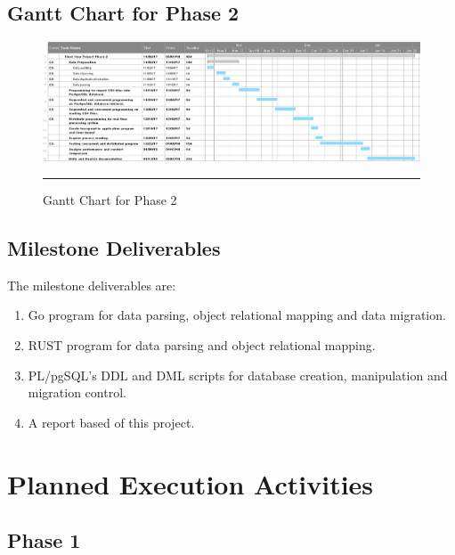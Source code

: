 \begin{landscape}
	\subsection{Gantt Chart for Phase 2}
	\begin{figure}[H]
		\centering
		\includegraphics[width=1.5\textwidth]{Figure/Gantt2.png}
		\rule{35em}{0.5pt}
		\caption[Gantt Chart for Phase 2]{Gantt Chart for Phase 2}
	\end{figure}
\end{landscape}


\subsection{Milestone Deliverables}
The milestone deliverables are:

\begin{enumerate}[topsep=0pt,itemsep=-1ex,partopsep=1ex,parsep=1ex]
\item Go program for data parsing, object relational mapping and data migration. 
\item RUST program for data parsing and object relational mapping.
\item PL/pgSQL's DDL and DML scripts for database creation, manipulation and migration control.
\item A report based of this project. 
\end{enumerate}

\section{Planned Execution Activities}

\subsection{Phase 1}

